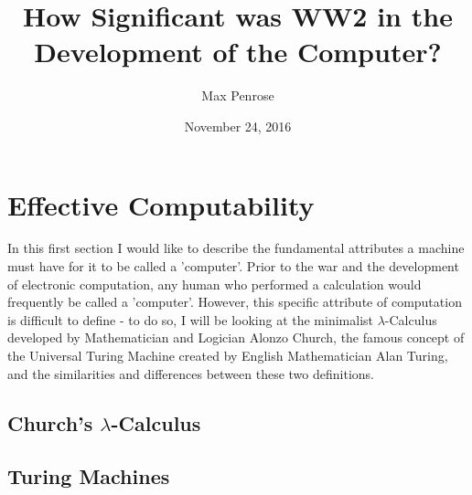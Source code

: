 \documentclass {article}
\title{How Significant was WW2 in the Development of the Computer?}
\date{November 24, 2016}
\author{Max Penrose}
\begin{document}
\maketitle
\tableofcontents

\section{Effective Computability}

In this first section I would like to describe the fundamental attributes a machine must have for it to be called a 'computer'. Prior to the war and the development of electronic computation, any human who performed a calculation would  frequently be called a 'computer'. However, this specific attribute of computation is difficult to define - to do so, I will be looking at the minimalist  $\lambda$-Calculus developed by Mathematician and Logician Alonzo Church, the famous concept of the Universal Turing Machine created by English Mathematician Alan Turing, and the similarities and differences between these two definitions.


\subsection{Church's $\lambda$-Calculus}



\subsection{Turing Machines}


\end{document}
